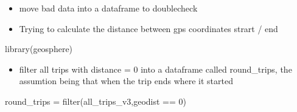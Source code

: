 \documentclass[
]{article}
\newenvironment{Shaded}{\begin{snugshade}}{\end{snugshade}}
\newcommand{\AttributeTok}[1]{\textcolor[rgb]{0.77,0.63,0.00}{#1}}
\newcommand{\DecValTok}[1]{\textcolor[rgb]{0.00,0.00,0.81}{#1}}
\newcommand{\FunctionTok}[1]{\textcolor[rgb]{0.00,0.00,0.00}{#1}}
\newcommand{\NormalTok}[1]{#1}
\newcommand{\OtherTok}[1]{\textcolor[rgb]{0.56,0.35,0.01}{#1}}
\newcommand{\SpecialCharTok}[1]{\textcolor[rgb]{0.00,0.00,0.00}{#1}}
\providecommand{\tightlist}{%
  \setlength{\itemsep}{0pt}\setlength{\parskip}{0pt}}
\begin{document}
\begin{Shaded}
\end{Shaded}

\begin{itemize}
\tightlist
\item
  move bad data into a dataframe to doublecheck
\end{itemize}

\begin{Shaded}
\end{Shaded}

\begin{itemize}
\tightlist
\item
  Trying to calculate the distance between gps coordinates strart / end
\end{itemize}

\begin{Shaded}
\begin{Highlighting}[]
\FunctionTok{library}\NormalTok{(geosphere) }
\end{Highlighting}
\end{Shaded}

\begin{Shaded}
\end{Shaded}

\begin{itemize}
\tightlist
\item
  filter all trips with distance = 0 into a dataframe called
  round\_trips, the assumtion being that when the trip ends where it
  started
\end{itemize}

\begin{Shaded}
\begin{Highlighting}[]
\NormalTok{round\_trips }\OtherTok{=} \FunctionTok{filter}\NormalTok{(all\_trips\_v3,geodist }\SpecialCharTok{==} \DecValTok{0}\NormalTok{)}
\end{Highlighting}
\end{Shaded}
\end{document}
